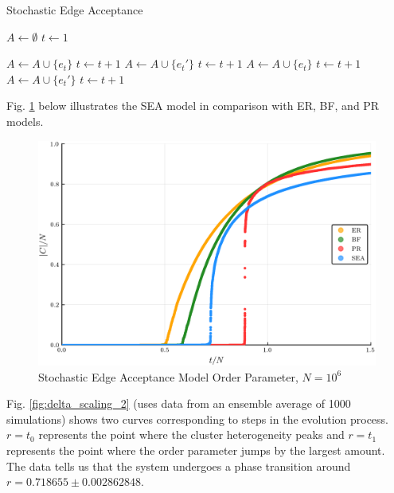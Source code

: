 \begin{algorithm}
	\caption{Stochastic Edge Acceptance}\label{Stochastic-Edge-Acceptance}
	\begin{algorithmic}[1]
		\State $A \gets \emptyset$
		\State $t \gets 1$

				\State $A \gets A \cup \{e_t\}$
				\State $t \gets t+1$
				\State $A \gets A \cup \{e_t'\}$
				\State $t \gets t+1$
				\State $A \gets A \cup \{e_t\}$
				\State $t \gets t+1$
			\Else
				\State $A \gets A \cup \{e_t'\}$
				\State $t \gets t+1$
			\EndIf
		\EndWhile
	\EndProcedure
	\end{algorithmic}
\end{algorithm}

Fig. \ref{fig:ER_BF_PR_SEA_transition} below illustrates the SEA model in comparison with ER, BF, and PR models.

\begin{figure}[H]
	\centering
	\includegraphics[width=350pt, clip]{images/Network_ER_BF_PR_SEA_1e6_order_param.png}
	\caption{Stochastic Edge Acceptance Model Order Parameter, $N = 10^6$}
	\label{fig:ER_BF_PR_SEA_transition}
\end{figure}

Fig. \ref{fig:delta_scaling_2} (uses data from an ensemble average of 1000 simulations) shows two curves corresponding to steps in the evolution process.
$r = t_0$ represents the point where the cluster heterogeneity peaks and $r = t_1$ represents the point where the order parameter jumps by the largest amount.
The data tells us that the system undergoes a phase transition around $r = 0.718655 \pm 0.002862848$.

